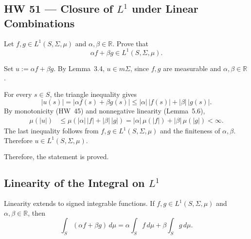 \subsection*{HW 51 --- Closure of $L^1$ under Linear Combinations}%
%

 Let $f,g\in L^1(S,\Sigma,\mu)$ and $\alpha,\beta\in\mathbb R$. Prove that
\[
\alpha f+\beta g\in L^1(S,\Sigma,\mu).
\]
\par\noindent{}\par\nobreak

Set $u:=\alpha f+\beta g$. By Lemma~3.4, $u\in m\Sigma$, since $f,g$ are measurable and $\alpha,\beta\in\mathbb R$.

For every $s\in S$, the triangle inequality gives
\[
|u(s)|=|\alpha f(s)+\beta g(s)|
\le|\alpha|\,|f(s)|+|\beta|\,|g(s)|.
\]
By monotonicity (HW~45) and nonnegative linearity (Lemma~5.6),
\[
\begin{aligned}
\mu(|u|)&\le\mu(|\alpha|\,|f|+|\beta|\,|g|) =|\alpha|\,\mu(|f|)+|\beta|\,\mu(|g|) <\infty.
\end{aligned}
\]
The last inequality follows from $f,g\in L^1(S,\Sigma,\mu)$ and the finiteness of $\alpha,\beta$. Therefore $u\in L^1(S,\Sigma,\mu)$.

Therefore, the statement is proved. 

\subsection*{Linearity of the Integral on $L^1$}%
%

Linearity extends to signed integrable functions. If $f,g\in L^1(S,\Sigma,\mu)$ and $\alpha,\beta\in\mathbb R$, then
\[
\int_S(\alpha f+\beta g)\,d\mu
=\alpha\int_S f\,d\mu+\beta\int_S g\,d\mu.
\]
\par\noindent{}\par\nobreak

